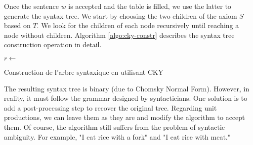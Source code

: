 \documentclass{KodeBook}
\begin{document}
Once the sentence $w$ is accepted and the table is filled, we use the latter to generate the syntax tree.
We start by choosing the two children of the axiom $S$ based on $T$.
We look for the children of each node recursively until reaching a node without children.
Algorithm \ref{algo:cky-constr} describes the syntax tree construction operation in detail.
\begin{algorithm}[ht]
	
	
	 {
		$r \leftarrow $ \;
	}
	
	
	\caption{Construction de l'arbre syntaxique en utilisant CKY}
	\label{algo:cky-constr}
\end{algorithm}
%
%	
%	
%	
%		
%	
%	

The resulting syntax tree is binary (due to Chomsky Normal Form).
However, in reality, it must follow the grammar designed by syntacticians.
One solution is to add a post-processing step to recover the original tree.
Regarding unit productions, we can leave them as they are and modify the  algorithm to accept them.
Of course, the algorithm still suffers from the problem of syntactic ambiguity.
For example, "I eat rice with a fork" and "I eat rice with meat."
\end{document}
